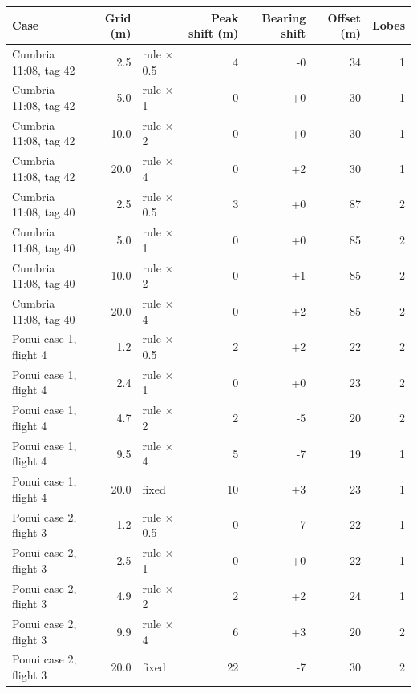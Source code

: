 \begin{tabular}{lrlrrrr}
\toprule
Case & Grid (m) &  & Peak shift (m) & Bearing shift & Offset (m) & Lobes \\
\midrule
Cumbria 11:08, tag 42 & 2.5 & rule $\times$ 0.5 & 4 & -0 & 34 & 1 \\
Cumbria 11:08, tag 42 & 5.0 & rule $\times$ 1 & 0 & +0 & 30 & 1 \\
Cumbria 11:08, tag 42 & 10.0 & rule $\times$ 2 & 0 & +0 & 30 & 1 \\
Cumbria 11:08, tag 42 & 20.0 & rule $\times$ 4 & 0 & +2 & 30 & 1 \\
Cumbria 11:08, tag 40 & 2.5 & rule $\times$ 0.5 & 3 & +0 & 87 & 2 \\
Cumbria 11:08, tag 40 & 5.0 & rule $\times$ 1 & 0 & +0 & 85 & 2 \\
Cumbria 11:08, tag 40 & 10.0 & rule $\times$ 2 & 0 & +1 & 85 & 2 \\
Cumbria 11:08, tag 40 & 20.0 & rule $\times$ 4 & 0 & +2 & 85 & 2 \\
Ponui case 1, flight 4 & 1.2 & rule $\times$ 0.5 & 2 & +2 & 22 & 2 \\
Ponui case 1, flight 4 & 2.4 & rule $\times$ 1 & 0 & +0 & 23 & 2 \\
Ponui case 1, flight 4 & 4.7 & rule $\times$ 2 & 2 & -5 & 20 & 2 \\
Ponui case 1, flight 4 & 9.5 & rule $\times$ 4 & 5 & -7 & 19 & 1 \\
Ponui case 1, flight 4 & 20.0 & fixed & 10 & +3 & 23 & 1 \\
Ponui case 2, flight 3 & 1.2 & rule $\times$ 0.5 & 0 & -7 & 22 & 1 \\
Ponui case 2, flight 3 & 2.5 & rule $\times$ 1 & 0 & +0 & 22 & 1 \\
Ponui case 2, flight 3 & 4.9 & rule $\times$ 2 & 2 & +2 & 24 & 1 \\
Ponui case 2, flight 3 & 9.9 & rule $\times$ 4 & 6 & +3 & 20 & 2 \\
Ponui case 2, flight 3 & 20.0 & fixed & 22 & -7 & 30 & 2 \\
\bottomrule
\end{tabular}
